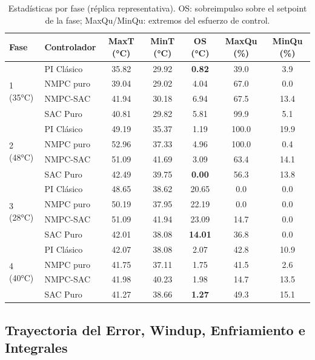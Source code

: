 \documentclass[processes,article,submit,moreauthors,pdftex]{Definitions/mdpi}
\begin{document}
\begin{table}[H]
\caption{Estadísticas por fase (réplica representativa). OS: sobreimpulso
         sobre el setpoint de la fase; MaxQu/MinQu: extremos del esfuerzo
         de control.}
\label{tab:phase_stats}
\setlength{\tabcolsep}{4.5pt}
\begin{tabular}{llccccc}
\toprule
\textbf{Fase} & \textbf{Controlador} &
\textbf{MaxT (°C)} & \textbf{MinT (°C)} & \textbf{OS (°C)} &
\textbf{MaxQu (\%)} & \textbf{MinQu (\%)} \\
\midrule
\multirow{4}{*}{1 (35°C)}
  & PI Clásico & 35.82 & 29.92 & \textbf{0.82} & 39.0 & 3.9 \\
  & NMPC puro  & 39.04 & 29.02 & 4.04 & 67.0 & 0.0 \\
  & NMPC-SAC   & 41.94 & 30.18 & 6.94 & 67.5 & 13.4 \\
  & SAC Puro   & 40.81 & 29.82 & 5.81 & 99.9 & 5.1 \\
\midrule
\multirow{4}{*}{2 (48°C)}
  & PI Clásico & 49.19 & 35.37 & 1.19 & 100.0 & 19.9 \\
  & NMPC puro  & 52.96 & 37.33 & 4.96 & 100.0 & 0.4 \\
  & NMPC-SAC   & 51.09 & 41.69 & 3.09 & 63.4 & 14.1 \\
  & SAC Puro   & 42.49 & 39.75 & \textbf{0.00} & 56.3 & 13.8 \\
\midrule
\multirow{4}{*}{3 (28°C)}
  & PI Clásico & 48.65 & 38.62 & 20.65 & 0.0 & 0.0 \\
  & NMPC puro  & 50.19 & 37.95 & 22.19 & 0.0 & 0.0 \\
  & NMPC-SAC   & 51.09 & 41.94 & 23.09 & 14.7 & 0.0 \\
  & SAC Puro   & 42.01 & 38.08 & \textbf{14.01} & 36.8 & 0.0 \\
\midrule
\multirow{4}{*}{4 (40°C)}
  & PI Clásico & 42.07 & 38.08 & 2.07 & 42.8 & 10.9 \\
  & NMPC puro  & 41.75 & 37.11 & 1.75 & 41.5 & 2.6 \\
  & NMPC-SAC   & 41.98 & 40.23 & 1.98 & 14.7 & 13.5 \\
  & SAC Puro   & 41.27 & 38.66 & \textbf{1.27} & 49.3 & 15.1 \\
\bottomrule
\end{tabular}
\end{table}

\subsection{Trayectoria del Error, Windup, Enfriamiento e Integrales}
\end{document}
